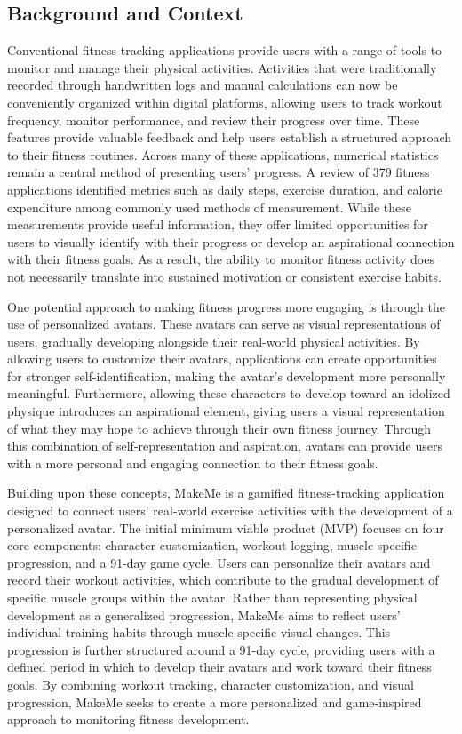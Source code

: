 \documentclass[11pt]{article}
\begin{document}
\subsection{Background and Context}
Conventional fitness-tracking applications provide users with a range of tools to monitor
and manage their physical activities. Activities that were traditionally recorded through
handwritten logs and manual calculations can now be conveniently organized within digital
platforms, allowing users to track workout frequency, monitor performance, and review their 
progress over time. These features provide valuable feedback and help users establish a
structured approach to their fitness routines. Across many of these applications,
numerical statistics remain a central method of presenting users' progress. 
A review of 379 fitness applications identified metrics such as daily steps, exercise duration, 
and calorie expenditure among commonly used methods of measurement.\cite{knight2015public}
While these measurements provide useful information, they offer limited opportunities
for users to visually identify with their progress or develop an aspirational connection
with their fitness goals. As a result, the ability to monitor fitness activity does not
necessarily translate into sustained motivation or consistent exercise habits. 

One potential approach to making fitness progress more engaging is through the use of
personalized avatars. These avatars can serve as visual representations of users,
gradually developing alongside their real-world physical activities. By allowing users
to customize their avatars, applications can create opportunities for stronger
self-identification, making the avatar's development more personally meaningful.
Furthermore, allowing these characters to develop toward an idolized physique introduces
an aspirational element, giving users a visual representation of what they may hope to
achieve through their own fitness journey. Through this combination of self-representation
and aspiration, avatars can provide users with a more personal and engaging
connection to their fitness goals.

Building upon these concepts, MakeMe is a gamified fitness-tracking application designed
to connect users' real-world exercise activities with the development of a personalized
avatar. The initial minimum viable product (MVP) focuses on four core components:
character customization, workout logging, muscle-specific progression, and a 91-day game
cycle. Users can personalize their avatars and record their workout activities,
which contribute to the gradual development of specific muscle groups within the avatar.
Rather than representing physical development as a generalized progression, MakeMe aims
to reflect users' individual training habits through muscle-specific visual changes. This
progression is further structured around a 91-day cycle, providing users with a defined
period in which to develop their avatars and work toward their fitness goals. By combining
workout tracking, character customization, and visual progression, MakeMe seeks to create
a more personalized and game-inspired approach to monitoring fitness development.
\end{document}
